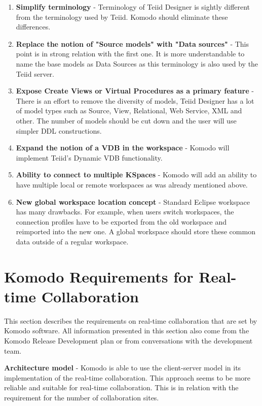 \documentclass[12pt,oneside]{fithesis2}
\begin{document}
\begin{enumerate}
\item \textbf{Simplify terminology} - Terminology of Teiid Designer is sightly different from the terminology used by Teiid. Komodo should eliminate these differences.
\item \textbf{Replace the notion of "Source models" with "Data sources" }- This point is in strong relation with the first one. It is more understandable to name the base models as Data Sources as this terminology is also used by the Teiid server.
\item \textbf{Expose Create Views or Virtual Procedures as a primary feature} - There is an effort to remove the diversity of models, Teiid Designer has a lot of model types such as Source, View, Relational, Web Service, XML and other. The number of models should be cut down and the user will use simpler DDL constructions.
\item \textbf{Expand the notion of a VDB in the workspace} - Komodo will implement Teiid's Dynamic VDB functionality.
\item \textbf{Ability to connect to multiple KSpaces} - Komodo will add an ability to have multiple local or remote workspaces as was already mentioned above.
\item \textbf{New global workspace location concept} - Standard Eclipse workspace has many drawbacks. For example, when users switch workspaces, the connection profiles have to be exported from the old workspace and reimported into the new one. A global workspace should store these common data outside of a regular workspace.
\end{enumerate}
\section{Komodo Requirements for Real-time Collaboration} \label{requirements}
\par This section describes the requirements on real-time collaboration that are set by Komodo software. All information presented in this section also come from the Komodo Release Development plan \cite{Komodo} or from conversations with the development team.

\vspace{3mm} 

\textbf{Architecture model} - Komodo is able to use the client-server model in its implementation of the real-time collaboration. This approach seems to be more reliable and suitable for real-time collaboration. This is in relation with the requirement for the number of collaboration sites.
\end{document}
